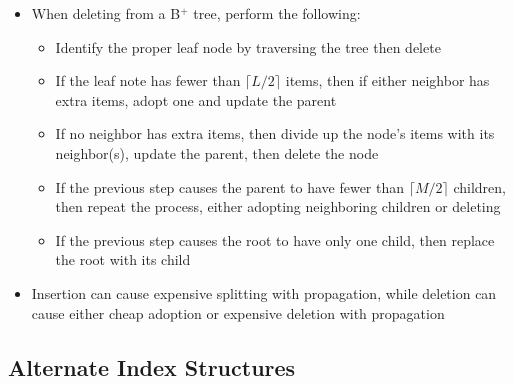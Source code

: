 \documentclass[a4paper]{article}
\begin{document}
\begin{itemize}
\item When deleting from a B$^+$ tree, perform the following:
\begin{itemize}
\item Identify the proper leaf node by traversing the tree then delete
\item If the leaf note has fewer than $\lceil L/2\rceil$ items, then if either neighbor has extra items, adopt one and update the parent
\item If no neighbor has extra items, then divide up the node's items with its neighbor(s), update the parent, then delete the node
\item If the previous step causes the parent to have fewer than $\lceil M/2\rceil$ children, then repeat the process, either adopting neighboring children or deleting
\item If the previous step causes the root to have only one child, then replace the root with its child
\end{itemize}

\item Insertion can cause expensive splitting with propagation, while deletion can cause either cheap adoption or expensive deletion with propagation
\end{itemize}

\subsection{Alternate Index Structures}
\end{document}
